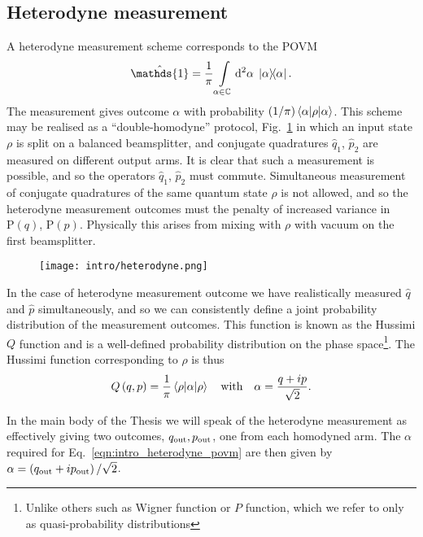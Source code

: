 \subsection{Heterodyne measurement}
A heterodyne measurement scheme corresponds to the POVM
\begin{equation}\label{eqn:intro_heterodyne_povm}
\hat{\mathds{1}} = \frac{1}{\pi} \int\limits_{\alpha \in \mathbb{C}} \Diff2 \alpha \; \dyad{\alpha}.
\end{equation}
The measurement gives outcome $\alpha$ with probability $(1/\pi)\ev{\rho}{\alpha}$. This scheme may be realised as a ``double-homodyne'' protocol, Fig.~\ref{fig:intro_heterodyne} in which an input state $\rho$ is split on a balanced beamsplitter, and conjugate quadratures $\hat{q}_1$, $\hat{p}_2$ are measured on different output arms. It is clear that such a measurement is possible, and so the operators $\hat{q}_1$, $\hat{p}_2$ must commute. Simultaneous measurement of conjugate quadratures of the same quantum state $\rho$ is not allowed, and so the heterodyne measurement outcomes must the penalty of increased variance in $\text{P}\left(q\right)$, $\text{P}\left(p\right)$. Physically this arises from mixing with $\rho$ with vacuum on the first beamsplitter.

\begin{figure}
\centering
\captionsetup{width=0.8\linewidth}
\texttt{[image: intro/heterodyne.png]}
\caption{\label{fig:intro_heterodyne}}
\end{figure}

In the case of heterodyne measurement outcome we have realistically measured $\hat{q}$ and $\hat{p}$ simultaneously, and so we can consistently define a joint probability distribution of the measurement outcomes. This function is known as the Hussimi $Q$ function and is a well-defined probability distribution on the phase space\footnote{Unlike others such as Wigner function or $P$ function, which we refer to only as quasi-probability distributions}. The Hussimi function corresponding to $\rho$ is thus
\begin{equation}
Q\left(q, p\right) = \frac{1}{\pi} \ev{\alpha}{\rho} \qq{with} \alpha = \frac{q + i p}{\sqrt{2}}.
\end{equation}

In the main body of the Thesis we will speak of the heterodyne measurement as effectively giving two outcomes, $q_{\text{out}}, p_{\text{out}}$, one from each homodyned arm. The $\alpha$ required for Eq.~\ref{eqn:intro_heterodyne_povm} are then given by $\alpha = \left(q_{\text{out}} + i p_{\text{out}}\right)/\sqrt{2}$.




